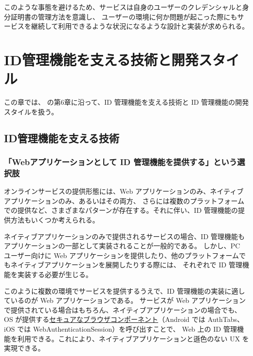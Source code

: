\documentclass[uplatex]{jsarticle}
\def\label#1{}%
\begin{document}
このような事態を避けるため、サービスは自身のユーザーのクレデンシャルと身分証明書の管理方法を意識し、
ユーザーの環境に何か問題が起こった際にもサービスを継続して利用できるような状況になるような設計と実装が求められる。

\section{ID管理機能を支える技術と開発スタイル}

この章では、\cite{Ito2026} の第6章に沿って、ID 管理機能を支える技術と ID 管理機能の開発スタイルを扱う。

\subsection{ID管理機能を支える技術}\label{subsec:ch6-technologies}

\subsubsection{「Webアプリケーションとして ID 管理機能を提供する」という選択肢}

オンラインサービスの提供形態には、Web アプリケーションのみ、ネイティブアプリケーションのみ、あるいはその両方、
さらには複数のプラットフォームでの提供など、さまざまなパターンが存在する。それに伴い、ID 管理機能の提供方法もいくつか考えられる。

ネイティブアプリケーションのみで提供されるサービスの場合、ID 管理機能もアプリケーションの一部として実装されることが一般的である。
しかし、PC ユーザー向けに Web アプリケーションを提供したり、他のプラットフォームでもネイティブアプリケーションを展開したりする際には、
それぞれで ID 管理機能を実装する必要が生じる。

このように複数の環境でサービスを提供するうえで、ID 管理機能の実装に適しているのが Web アプリケーションである。
サービスが Web アプリケーションで提供されている場合はもちろん、ネイティブアプリケーションの場合でも、
OS が提供する\underline{セキュアなブラウザコンポーネント}（Android では AuthTabs、iOS では WebAuthenticationSession）を呼び出すことで、
Web 上の ID 管理機能を利用できる。これにより、ネイティブアプリケーションと遜色のない UX を実現できる。
\end{document}
